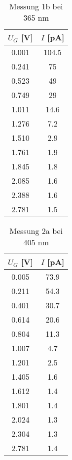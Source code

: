 \documentclass{article}
\begin{document}
\begin{table*}[h!]
  \centering
  \begin{tabular}{|c|c|}
      \hline
      $U_G$ [V] & $I$ [pA] \\
      \hline
      0.001  & 104.5 \\
      0.241  & 75    \\
      0.523  & 49    \\
      0.749  & 29    \\
      1.011  & 14.6  \\
      1.276  & 7.2   \\
      1.510  & 2.9   \\
      1.761  & 1.9   \\
      1.845  & 1.8   \\
      2.085  & 1.6   \\
      2.388  & 1.6   \\
      2.781  & 1.5   \\
      \hline
  \end{tabular}
  \caption{Messung 1b bei 365 nm}
  \label{tab:messung1b}
\end{table*}

\begin{table*}[h!]
  \centering
  \begin{tabular}{|c|c|}
      \hline
      $U_G$ [V] & $I$ [pA] \\
      \hline
      0.005  & 73.9 \\
      0.211  & 54.3 \\
      0.401  & 30.7 \\
      0.614  & 20.6 \\
      0.804  & 11.3 \\
      1.007  & 4.7  \\
      1.201  & 2.5  \\
      1.405  & 1.6  \\
      1.612  & 1.4  \\
      1.801  & 1.4  \\
      2.024  & 1.3  \\
      2.304  & 1.3  \\
      2.781  & 1.4  \\
      \hline
  \end{tabular}
  \caption{Messung 2a bei 405 nm}
  \label{tab:messung365}
\end{table*}
\end{document}
